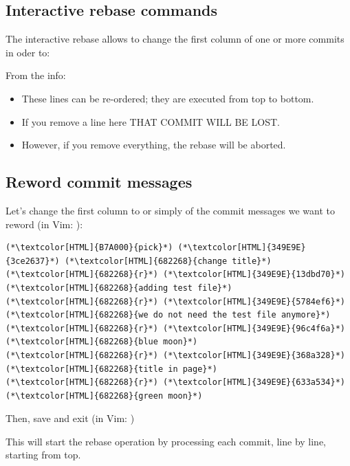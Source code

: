 \subsection{Interactive rebase commands}
\begin{frame}[fragile]
  \subslidetitle

  The interactive rebase allows to change the first column of one or more commits in oder to:

  \begin{itemize}
  \end{itemize}

  \vspace{1em}
  From the  info:
  \begin{itemize}
    \item These lines can be re-ordered; they are executed from top to bottom.
    \item If you remove a line here THAT COMMIT WILL BE LOST.
    \item However, if you remove everything, the rebase will be aborted.
  \end{itemize}

\end{frame}

\subsection{Reword commit messages}
\begin{frame}[fragile]
  \subslidetitle

  Let's change the first column to  or simply  of the commit messages we want to reword (in Vim: ):
  \begin{lstlisting}
(*\textcolor[HTML]{B7A000}{pick}*) (*\textcolor[HTML]{349E9E}{3ce2637}*) (*\textcolor[HTML]{682268}{change title}*)
(*\textcolor[HTML]{682268}{r}*) (*\textcolor[HTML]{349E9E}{13dbd70}*) (*\textcolor[HTML]{682268}{adding test file}*)
(*\textcolor[HTML]{682268}{r}*) (*\textcolor[HTML]{349E9E}{5784ef6}*) (*\textcolor[HTML]{682268}{we do not need the test file anymore}*)
(*\textcolor[HTML]{682268}{r}*) (*\textcolor[HTML]{349E9E}{96c4f6a}*) (*\textcolor[HTML]{682268}{blue moon}*)
(*\textcolor[HTML]{682268}{r}*) (*\textcolor[HTML]{349E9E}{368a328}*) (*\textcolor[HTML]{682268}{title in page}*)
(*\textcolor[HTML]{682268}{r}*) (*\textcolor[HTML]{349E9E}{633a534}*) (*\textcolor[HTML]{682268}{green moon}*)
\end{lstlisting}
  Then, save and exit (in Vim: )

  \vspace{1em}
  This will start the rebase operation by processing each commit, line by line, starting from top.

\end{frame}

